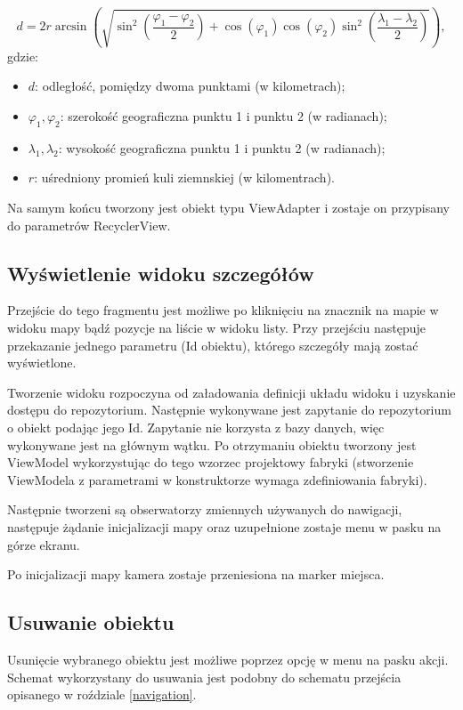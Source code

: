 \documentclass[polish,polish,a4paper,12pt]{article}
\begin{document}
	\begin{equation}
d = 2r\arcsin(\sqrt{\sin^2(\frac{\varphi_1-\varphi_2}{2})+\cos(\varphi_1)\cos(\varphi_2)\sin^2(\frac{\lambda_1-\lambda_2}{2})}),\label{eq:1}
	\end{equation}
	gdzie:
	\begin{itemize}
		\item $ d $: odległość, pomiędzy dwoma punktami (w kilometrach);
		\item $ \varphi_1, \varphi_2 $: szerokość geograficzna punktu 1 i punktu 2 (w radianach);
		\item $ \lambda_1, \lambda_2 $: wysokość geograficzna punktu 1 i punktu 2 (w radianach);
		\item $ r $: uśredniony promień kuli ziemnskiej (w kilomentrach).
	\end{itemize}

	Na samym końcu tworzony jest obiekt typu ViewAdapter i zostaje on przypisany do parametrów RecyclerView.

	\subsection{Wyświetlenie widoku szczegółów}

	Przejście do tego fragmentu jest możliwe po kliknięciu na znacznik na mapie w widoku mapy bądź pozycje na liście w widoku listy. Przy przejściu następuje przekazanie jednego parametru (Id obiektu), którego szczegóły mają zostać wyświetlone.

	Tworzenie widoku rozpoczyna od załadowania definicji układu widoku i uzyskanie dostępu do repozytorium. Następnie wykonywane jest zapytanie do repozytorium o obiekt podając jego Id. Zapytanie nie korzysta z bazy danych, więc wykonywane jest na głównym wątku. Po otrzymaniu obiektu tworzony jest ViewModel wykorzystując do tego wzorzec projektowy fabryki (stworzenie ViewModela z parametrami w konstruktorze wymaga zdefiniowania fabryki).

	Następnie tworzeni są obserwatorzy zmiennych używanych do nawigacji, następuje żądanie inicjalizacji mapy oraz uzupełnione zostaje menu w pasku na górze ekranu.

	Po inicjalizacji mapy kamera zostaje przeniesiona na marker miejsca.

	\subsection{Usuwanie obiektu}

	Usunięcie wybranego obiektu jest możliwe poprzez opcję w menu na pasku akcji. Schemat wykorzystany do usuwania jest podobny do schematu przejścia opisanego w roździale \ref{navigation}.
\end{document}
